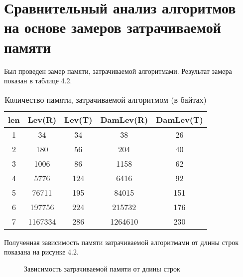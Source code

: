 \documentclass[12pt]{report}
\begin{document}
\section{Сравнительный анализ алгоритмов на основе замеров затрачиваемой памяти}
Был проведен замер памяти, затрачиваемой алгоритмами. Результат замера показан в таблице 4.2.


\begin{table} [H]
	\caption{Количество памяти, затрачиваемой алгоритмом (в байтах)}
	\begin{tabular}{|c c c c c|} 
		\hline
		len & Lev(R) & Lev(T) & DamLev(R) & DamLev(T) \\ [0.8ex] 
		\hline\hline
		1 & 34 & 34 & 38 & 26\\
		\hline
		2 & 180 & 56 & 204 & 40\\
		\hline
		3 & 1006 & 86 & 1158 & 62\\
		\hline
		4 & 5776 & 124 & 6416 & 92\\
		\hline
		5 & 76711 & 195 & 84015 & 151\\
		\hline
		6 & 197756 & 224 & 215732 & 176\\
		\hline
		7 & 1167334 & 286 & 1264610 & 230\\
		\hline
	\end{tabular}
	
\end{table}



Полученная зависимость памяти затрачиваемой алгоритмами от длины строк показана на рисунке 4.2.

\begin{figure} [H]
	\caption{Зависимость затрачиваемой памяти от длины строк}
\end{figure}
\end{document}
